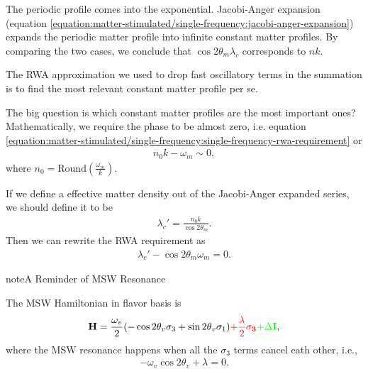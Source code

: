 \documentclass[letterpaper,12pt,english]{sphinxmanual}
\begin{document}
The periodic profile comes into the exponential. Jacobi-Anger expansion (equation \eqref{equation:matter-stimulated/single-frequency:jacobi-anger-expansion}) expands the periodic matter profile into infinite constant matter profiles. By comparing the two cases, we conclude that \(\cos 2\theta_m\lambda_c\) corresponds to \(nk\).

The RWA approximation we used to drop fast oscillatory terms in the summation is to find the most relevant constant matter profile per se.

The big question is which constant matter profiles are the most important ones? Mathematically, we require the phase to be almost zero, i.e. equation \eqref{equation:matter-stimulated/single-frequency:single-frequency-rwa-requirement} or
\begin{equation*}
\begin{split}n_0 k - \omega_m \sim 0 ,\end{split}
\end{equation*}
where \(n_0=\mathrm{Round}\left( \frac{\omega_m}{k} \right)\).

 If we define a effective matter density out of the Jacobi-Anger expanded series, we should define it to be
\begin{equation*}
\begin{split}\lambda_c' = \frac{n_0 k}{\cos 2\theta_m}.\end{split}
\end{equation*}
Then we can rewrite the RWA requirement as
\begin{equation*}
\begin{split}\lambda_c' - \cos 2\theta_m \omega_m = 0.\end{split}
\end{equation*}
\begin{sphinxadmonition}{note}{A Reminder of MSW Resonance}

The MSW Hamiltonian in flavor basis is
\begin{equation*}
\begin{split}\mathbf H = \frac{\omega_v}{2}( -\cos2\theta_v \sigma_3 + \sin 2\theta_v \sigma_1 )   {\color{red} + \frac{\lambda}{2} \mathbf {\sigma_3}}  {\color{green}+ \Delta \mathbf I},\end{split}
\end{equation*}
where the MSW resonance happens when all the \(\sigma_3\) terms cancel eath other, i.e.,
\begin{equation*}
\begin{split}- \omega_v \cos 2\theta_v  + \lambda = 0.\end{split}
\end{equation*}\end{sphinxadmonition}
\end{document}
